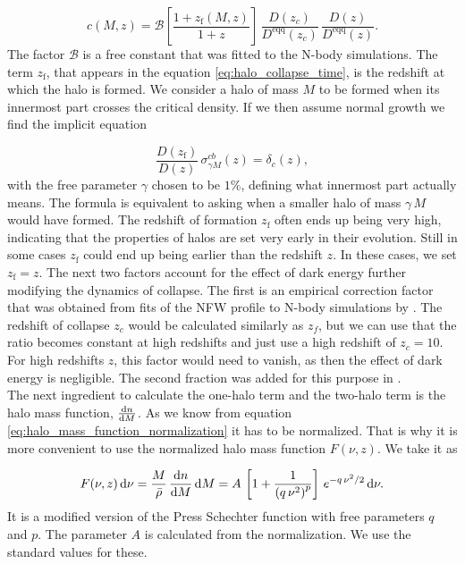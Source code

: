 \documentclass[../main.tex]{subfiles}
\begin{document}
\begin{equation}
    \label{eq:halo_collapse_time}
    c(M,z) = \mathcal{B}\left[\frac{1+z_\mathrm{f}(M,z)}{1+z}\right]\,\frac{D(z_c)}{D^\mathrm{eqq}(z_c)}\,\frac{D(z)}{D^\mathrm{eqq}(z)}.
\end{equation}
The factor $\mathcal{B}$ is a free constant that was fitted to the N-body simulations. The term $z_\mathrm{f}$, that appears in the equation \ref{eq:halo_collapse_time}, is the redshift at which the halo is formed. We consider a halo of mass $M$ to be formed when its innermost part crosses the critical density. If we then assume normal growth we find the implicit equation

\begin{equation}
    \frac{D(z_\mathrm{f})}{D(z)}\,\sigma^{cb}_{\gamma M }(z) = \delta_c(z),
\end{equation}
with the free parameter $\gamma$ chosen to be $1\%$, defining what innermost part actually means. The formula is equivalent to asking when a smaller halo of mass $\gamma\,M$ would have formed. The redshift of formation $z_\mathrm{f}$ often ends up being very high, indicating that the properties of halos are set very early in their evolution. Still in some cases $z_\mathrm{f}$ could end up being earlier than the redshift $z$. In these cases, we set $z_\mathrm{f}=z$. The next two factors account for the effect of dark energy further modifying the dynamics of collapse. The first is an empirical correction factor that was obtained from fits of the NFW profile to N-body simulations by \cite{2004A&A...416..853D}. The redshift of collapse $z_c$ would be calculated similarly as $z_f$, but we can use that the ratio becomes constant at high redshifts and just use a high redshift of $z_c=10$. For high redshifts $z$, this factor would need to vanish, as then the effect of dark energy is negligible. The second fraction was added for this purpose in \hmcode.\\
The next ingredient to calculate the one-halo term and the two-halo term is the halo mass function, $\frac{\mathrm{d} n}{\mathrm{d} M}$. As we know from equation \ref{eq:halo_mass_function_normalization} it has to be normalized.  That is why it is more convenient to use the normalized halo mass function $F(\nu,z)$. We take it as

\begin{equation}
    F(\nu,z) \,\mathrm{d} \nu= \frac{M}{\bar{\rho}}\, \frac{\mathrm{d} n}{\mathrm{d} M} \, \mathrm{d} M = A\,\left[1+\frac{1}{\left(q\,\nu^2\right)^p}\right]\,e^{-q\,\nu^2/2} \,\mathrm{d} \nu.
\end{equation}
It is a modified version of the Press Schechter function with free parameters $q$ and $p$. The parameter $A$ is calculated from the normalization. We use the standard values for these.
\end{document}
